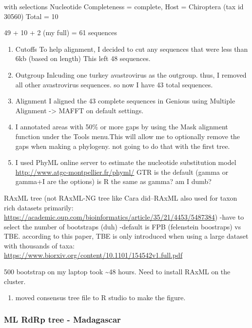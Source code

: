 \documentclass[
]{article}
\providecommand{\tightlist}{%
  \setlength{\itemsep}{0pt}\setlength{\parskip}{0pt}}
\begin{document}
with selections Nucleotide Completeness = complete, Host = Chiroptera
(tax id 30560) Total = 10

49 + 10 + 2 (my full) = 61 sequences

\begin{enumerate}
\def\labelenumi{\arabic{enumi}.}
\setcounter{enumi}{2}
\item
  Cutoffs To help alignment, I decided to cut any sequences that were
  less than 6kb (based on length) This left 48 sequences.
\item
  Outgroup Inlcuding one turkey avastrovirus as the outgroup. thus, I
  removed all other avastrovirus sequences. so now I have 43 total
  sequences.
\item
  Alignment I aligned the 43 complete sequences in Genious using
  Multiple Alignment -\textgreater{} MAFFT on default settings.
\item
  I annotated areas with 50\% or more gaps by using the Mask alignment
  function under the Tools menu.This will allow me to optionally remove
  the gaps when making a phylogeny. not going to do that with the first
  tree.
\item
  I used PhyML online server to estimate the nucleotide substitution
  model \url{http://www.atgc-montpellier.fr/phyml/} GTR is the default
  (gamma or gamma+I are the options) is R the same as gamma? am I dumb?
\end{enumerate}

RAxML tree (not RAxML-NG tree like Cara did--RAxML also used for taxon
rich datasets primarily:
\url{https://academic.oup.com/bioinformatics/article/35/21/4453/5487384})
-have to select the number of bootstraps (duh) -default is FPB
(felenstein boostraps) vs TBE. according to this paper, TBE is only
introduced when using a large dataset with thousands of taxa:
\url{https://www.biorxiv.org/content/10.1101/154542v1.full.pdf}

500 bootstrap on my laptop took \textasciitilde48 hours. Need to install
RAxML on the cluster.

\begin{enumerate}
\def\labelenumi{\arabic{enumi}.}
\setcounter{enumi}{5}
\tightlist
\item
  moved consensus tree file to R studio to make the figure.
\end{enumerate}

\hypertarget{ml-rdrp-tree---madagascar}{%
\subsubsection{ML RdRp tree -
Madagascar}\label{ml-rdrp-tree---madagascar}}
\end{document}
